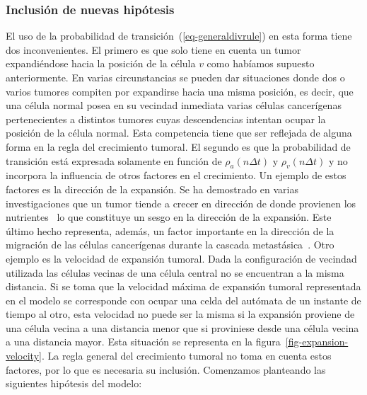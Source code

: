 \subsubsection{Inclusi\'on de nuevas hip\'otesis}
El uso de la probabilidad de transici\'on~(\ref{eq-generaldivrule}) en esta forma tiene dos inconvenientes. El primero es que solo tiene en cuenta un tumor expandi\'endose hacia la posici\'on de la c\'elula $v$ como hab\'iamos supuesto anteriormente. En varias circunstancias se pueden dar situaciones donde dos o varios tumores compiten por expandirse hacia una misma posici\'on, es decir, que una c\'elula normal posea en su vecindad inmediata varias c\'elulas cancer\'igenas pertenecientes a distintos tumores cuyas descendencias intentan ocupar la posici\'on de la c\'elula normal. Esta competencia tiene que ser reflejada de alguna forma en la regla del crecimiento tumoral. El segundo es que la probabilidad de transici\'on est\'a expresada solamente en funci\'on de $\rho_a(n\Delta t)$ y $\rho_v(n\Delta t)$ y no incorpora la influencia de otros factores en el crecimiento. Un ejemplo de estos factores es la direcci\'on de la expansi\'on. Se ha demostrado en varias investigaciones que un tumor tiende a crecer en direcci\'on de donde provienen los nutrientes~\cite{kansal3} lo que constituye un sesgo en la direcci\'on de la expansi\'on. Este \'ultimo hecho representa, adem\'as, un factor importante en la direcci\'on de la migraci\'on de las c\'elulas cancer\'igenas durante la cascada metast\'asica~\cite{kansal3}. Otro ejemplo es la velocidad de expansi\'on tumoral. Dada la configuraci\'on de vecindad utilizada las c\'elulas vecinas de una c\'elula central no se encuentran a la misma distancia. Si se toma que la velocidad m\'axima de expansi\'on tumoral representada en el modelo se corresponde con ocupar una celda del aut\'omata de un instante de tiempo al otro, esta velocidad no puede ser la misma si la expansi\'on proviene de una c\'elula vecina a una distancia menor que si proviniese desde una c\'elula vecina a una distancia mayor. Esta situaci\'on se representa en la figura~\ref{fig-expansion-velocity}. La regla general del crecimiento tumoral no toma en cuenta estos factores, por lo que es necesaria su inclusi\'on. Comenzamos planteando las siguientes hip\'otesis del modelo:
